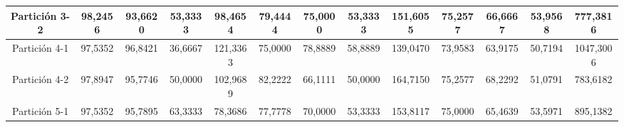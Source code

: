 \documentclass[12pt]{article}
\begin{document}
\begin{table}[H]
{\begin{tabular}{|c|cccc|cccc|cccc|}
Partición 3-2 & \multicolumn{1}{c|}{98,2456}                                                  & \multicolumn{1}{c|}{93,6620}                                                 & \multicolumn{1}{c|}{53,3333} & 98,4654  & \multicolumn{1}{c|}{79,4444}                                                  & \multicolumn{1}{c|}{75,0000}                                                 & \multicolumn{1}{c|}{53,3333} & 151,6055 & \multicolumn{1}{c|}{75,2577}                                                  & \multicolumn{1}{c|}{66,6667}                                                 & \multicolumn{1}{c|}{53,9568} & 777,3816  \\ \hline
Partición 4-1 & \multicolumn{1}{c|}{97,5352}                                                  & \multicolumn{1}{c|}{96,8421}                                                 & \multicolumn{1}{c|}{36,6667} & 121,3363 & \multicolumn{1}{c|}{75,0000}                                                  & \multicolumn{1}{c|}{78,8889}                                                 & \multicolumn{1}{c|}{58,8889} & 139,0470 & \multicolumn{1}{c|}{73,9583}                                                  & \multicolumn{1}{c|}{63,9175}                                                 & \multicolumn{1}{c|}{50,7194} & 1047,3006 \\ \hline
Partición 4-2 & \multicolumn{1}{c|}{97,8947}                                                  & \multicolumn{1}{c|}{95,7746}                                                 & \multicolumn{1}{c|}{50,0000} & 102,9689 & \multicolumn{1}{c|}{82,2222}                                                  & \multicolumn{1}{c|}{66,1111}                                                 & \multicolumn{1}{c|}{50,0000} & 164,7150 & \multicolumn{1}{c|}{75,2577}                                                  & \multicolumn{1}{c|}{68,2292}                                                 & \multicolumn{1}{c|}{51,0791} & 783,6182  \\ \hline
Partición 5-1 & \multicolumn{1}{c|}{97,5352}                                                  & \multicolumn{1}{c|}{95,7895}                                                 & \multicolumn{1}{c|}{63,3333} & 78,3686  & \multicolumn{1}{c|}{77,7778}                                                  & \multicolumn{1}{c|}{70,0000}                                                 & \multicolumn{1}{c|}{53,3333} & 153,8117 & \multicolumn{1}{c|}{75,0000}                                                  & \multicolumn{1}{c|}{65,4639}                                                 & \multicolumn{1}{c|}{53,5971} & 895,1382  \\ \hline

\end{tabular}}
\end{table}
\end{document}
